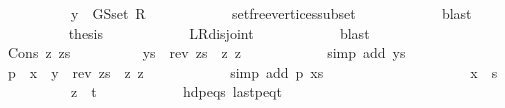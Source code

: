 \begin{isabellebody}
\ \ \ \ \ \ \ \ \ \ {\isachardoublequoteopen}y\ {\isasymin}\ G{\isachardot}{\kern0pt}S{\isachardot}{\kern0pt}set\ R{\isachardoublequoteclose}\isanewline
\ \ \ \ \ \ \ \ \ \ \isamarkupfalse%
\ set{\isacharunderscore}{\kern0pt}free{\isacharunderscore}{\kern0pt}vertices{\isacharunderscore}{\kern0pt}subset\isanewline
\ \ \ \ \ \ \ \ \ \ \isamarkupfalse%
\ blast{\isacharplus}{\kern0pt}\isanewline
\ \ \ \ \ \ \ \ \isamarkupfalse%
\ {\isacharquery}{\kern0pt}thesis\isanewline
\ \ \ \ \ \ \ \ \ \ \isamarkupfalse%
\ L{\isacharunderscore}{\kern0pt}R{\isacharunderscore}{\kern0pt}disjoint\isanewline
\ \ \ \ \ \ \ \ \ \ \isamarkupfalse%
\ blast\isanewline
\ \ \ \ \ \ \isamarkupfalse%
\isanewline
\ \ \ \ \ \ \ \ \isamarkupfalse%
\ {\isacharparenleft}{\kern0pt}Cons\ z{\isacharprime}{\kern0pt}\ zs{\isacharprime}{\kern0pt}{\isacharparenright}{\kern0pt}\isanewline
\ \ \ \ \ \ \ \ \isamarkupfalse%
\ {\isachardoublequoteopen}ys\ {\isacharequal}{\kern0pt}\ rev\ zs{\isacharprime}{\kern0pt}\ {\isacharat}{\kern0pt}\ {\isacharbrackleft}{\kern0pt}z{\isacharprime}{\kern0pt}{\isacharcomma}{\kern0pt}\ z{\isacharbrackright}{\kern0pt}{\isachardoublequoteclose}\isanewline
\ \ \ \ \ \ \ \ \ \ \isamarkupfalse%
\ {\isacharparenleft}{\kern0pt}simp\ add{\isacharcolon}{\kern0pt}\ ys{\isacharparenright}{\kern0pt}\isanewline
\ \ \ \ \ \ \ \ \isamarkupfalse%
\ {\isachardoublequoteopen}{\isacharquery}{\kern0pt}p\ {\isacharequal}{\kern0pt}\ x\ {\isacharhash}{\kern0pt}\ y\ {\isacharhash}{\kern0pt}\ rev\ zs{\isacharprime}{\kern0pt}\ {\isacharat}{\kern0pt}\ {\isacharbrackleft}{\kern0pt}z{\isacharprime}{\kern0pt}{\isacharcomma}{\kern0pt}\ z{\isacharbrackright}{\kern0pt}{\isachardoublequoteclose}\isanewline
\ \ \ \ \ \ \ \ \ \ \isamarkupfalse%
\ {\isacharparenleft}{\kern0pt}simp\ add{\isacharcolon}{\kern0pt}\ p\ xs{\isacharparenright}{\kern0pt}\isanewline
\ \ \ \ \ \ \ \ \isamarkupfalse%
\ \isamarkupfalse%
\isanewline
\ \ \ \ \ \ \ \ \ \ {\isachardoublequoteopen}x\ {\isacharequal}{\kern0pt}\ s{\isachardoublequoteclose}\isanewline
\ \ \ \ \ \ \ \ \ \ {\isachardoublequoteopen}z\ {\isacharequal}{\kern0pt}\ t{\isachardoublequoteclose}\isanewline
\ \ \ \ \ \ \ \ \ \ \isamarkupfalse%
\ hd{\isacharunderscore}{\kern0pt}p{\isacharunderscore}{\kern0pt}eq{\isacharunderscore}{\kern0pt}s\ last{\isacharunderscore}{\kern0pt}p{\isacharunderscore}{\kern0pt}eq{\isacharunderscore}{\kern0pt}t\isanewline

\end{isabellebody}
